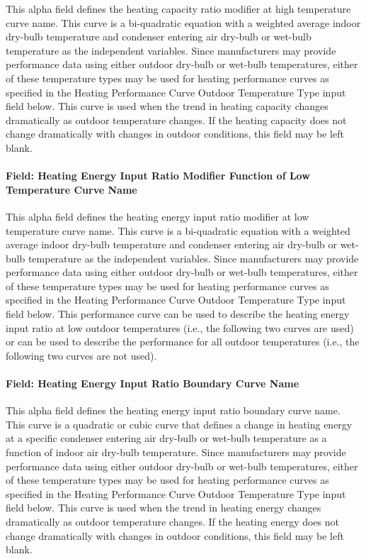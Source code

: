 This alpha field defines the heating capacity ratio modifier at high temperature curve name. This curve is a bi-quadratic equation with a weighted average indoor dry-bulb temperature and condenser entering air dry-bulb or wet-bulb temperature as the independent variables. Since manufacturers may provide performance data using either outdoor dry-bulb or wet-bulb temperatures, either of these temperature types may be used for heating performance curves as specified in the Heating Performance Curve Outdoor Temperature Type input field below. This curve is used when the trend in heating capacity changes dramatically as outdoor temperature changes. If the heating capacity does not change dramatically with changes in outdoor conditions, this field may be left blank.

\paragraph{Field: Heating Energy Input Ratio Modifier Function of Low Temperature Curve Name}\label{field-heating-energy-input-ratio-modifier-function-of-low-temperature-curve-name}

This alpha field defines the heating energy input ratio modifier at low temperature curve name. This curve is a bi-quadratic equation with a weighted average indoor dry-bulb temperature and condenser entering air dry-bulb or wet-bulb temperature as the independent variables. Since manufacturers may provide performance data using either outdoor dry-bulb or wet-bulb temperatures, either of these temperature types may be used for heating performance curves as specified in the Heating Performance Curve Outdoor Temperature Type input field below. This performance curve can be used to describe the heating energy input ratio at low outdoor temperatures (i.e., the following two curves are used) or can be used to describe the performance for all outdoor temperatures (i.e., the following two curves are not used).

\paragraph{Field: Heating Energy Input Ratio Boundary Curve Name}\label{field-heating-energy-input-ratio-boundary-curve-name}

This alpha field defines the heating energy input ratio boundary curve name. This curve is a quadratic or cubic curve that defines a change in heating energy at a specific condenser entering air dry-bulb or wet-bulb temperature as a function of indoor air dry-bulb temperature. Since manufacturers may provide performance data using either outdoor dry-bulb or wet-bulb temperatures, either of these temperature types may be used for heating performance curves as specified in the Heating Performance Curve Outdoor Temperature Type input field below. This curve is used when the trend in heating energy changes dramatically as outdoor temperature changes. If the heating energy does not change dramatically with changes in outdoor conditions, this field may be left blank.


